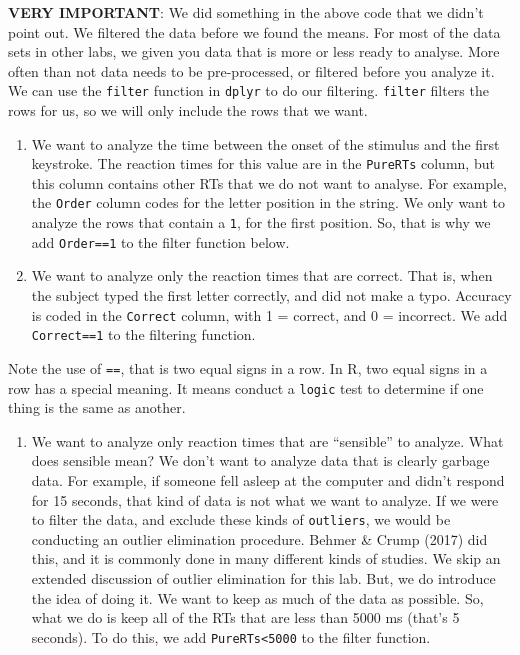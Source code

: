 \documentclass[]{book}
\providecommand{\tightlist}{%
  \setlength{\itemsep}{0pt}\setlength{\parskip}{0pt}}
\begin{document}
\textbf{VERY IMPORTANT}: We did something in the above code that we
didn't point out. We filtered the data before we found the means. For
most of the data sets in other labs, we given you data that is more or
less ready to analyse. More often than not data needs to be
pre-processed, or filtered before you analyze it. We can use the
\texttt{filter} function in \texttt{dplyr} to do our filtering.
\texttt{filter} filters the rows for us, so we will only include the
rows that we want.

\begin{enumerate}
\def\labelenumi{\arabic{enumi}.}
\item
  We want to analyze the time between the onset of the stimulus and the
  first keystroke. The reaction times for this value are in the
  \texttt{PureRTs} column, but this column contains other RTs that we do
  not want to analyse. For example, the \texttt{Order} column codes for
  the letter position in the string. We only want to analyze the rows
  that contain a \texttt{1}, for the first position. So, that is why we
  add \texttt{Order==1} to the filter function below.
\item
  We want to analyze only the reaction times that are correct. That is,
  when the subject typed the first letter correctly, and did not make a
  typo. Accuracy is coded in the \texttt{Correct} column, with 1 =
  correct, and 0 = incorrect. We add \texttt{Correct==1} to the
  filtering function.
\end{enumerate}

Note the use of \texttt{==}, that is two equal signs in a row. In R, two
equal signs in a row has a special meaning. It means conduct a
\texttt{logic} test to determine if one thing is the same as another.

\begin{enumerate}
\def\labelenumi{\arabic{enumi}.}
\setcounter{enumi}{2}
\tightlist
\item
  We want to analyze only reaction times that are ``sensible'' to
  analyze. What does sensible mean? We don't want to analyze data that
  is clearly garbage data. For example, if someone fell asleep at the
  computer and didn't respond for 15 seconds, that kind of data is not
  what we want to analyze. If we were to filter the data, and exclude
  these kinds of \texttt{outliers}, we would be conducting an outlier
  elimination procedure. Behmer \& Crump (2017) did this, and it is
  commonly done in many different kinds of studies. We skip an extended
  discussion of outlier elimination for this lab. But, we do introduce
  the idea of doing it. We want to keep as much of the data as possible.
  So, what we do is keep all of the RTs that are less than 5000 ms
  (that's 5 seconds). To do this, we add \texttt{PureRTs\textless{}5000}
  to the filter function.
\end{enumerate}
\end{document}

